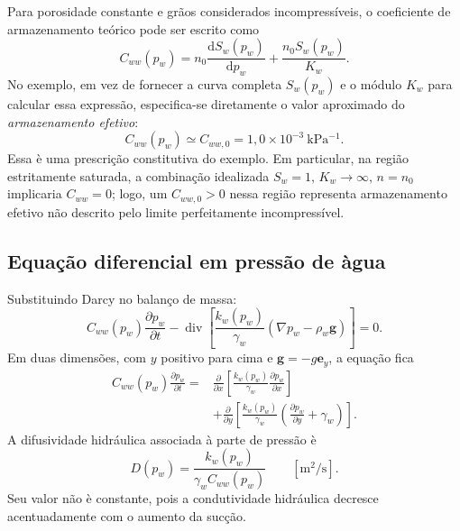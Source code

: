 \documentclass[11pt,a4paper]{article}
\newcommand{\Div}{\operatorname{div}}
\newcommand{\dd}{\mathrm{d}}
\begin{document}
Para porosidade constante e gr\~aos considerados incompress\'iveis,
o coeficiente de armazenamento te\'orico pode ser escrito como
\begin{equation*}
\boxed{C_{ww}(p_w)=
n_0\frac{\dd S_w(p_w)}{\dd p_w}
+\frac{n_0S_w(p_w)}{K_w}.}
\end{equation*}
No exemplo, em vez de fornecer a curva completa $S_w(p_w)$ e o m\'odulo
$K_w$ para calcular essa express\~ao, especifica-se diretamente
o valor aproximado do \emph{armazenamento efetivo}:
\begin{equation*}
\boxed{C_{ww}(p_w)\simeq C_{ww,0}
=1{,}0\times10^{-3}\ \mathrm{kPa^{-1}}.}
\end{equation*}
Essa \`e uma prescri\c{c}\~ao constitutiva do exemplo. Em particular,
na regi\~ao estritamente saturada, a combina\c{c}\~ao idealizada
$S_w=1$, $K_w\to\infty$, $n=n_0$ implicaria $C_{ww}=0$;
logo, um $C_{ww,0}>0$ nessa regi\~ao representa armazenamento
efetivo n\~ao descrito pelo limite perfeitamente incompress\'ivel.

\subsection{Equa\c{c}\~ao diferencial em press\~ao de \`agua}

Substituindo Darcy no balan\c{c}o de massa:
\begin{equation*}
\boxed{C_{ww}(p_w)\frac{\partial p_w}{\partial t}
-\Div\left[\frac{k_w(p_w)}{\gamma_w}
\left(\nabla p_w-\rho_w\mathbf g\right)\right]=0.}
\end{equation*}
Em duas dimens\~oes, com $y$ positivo para cima e
$\mathbf g=-g\mathbf e_y$, a equa\c{c}\~ao fica
\begin{equation*}
\boxed{\begin{aligned}
C_{ww}(p_w)\frac{\partial p_w}{\partial t}
={}&\frac{\partial}{\partial x}\left[
\frac{k_w(p_w)}{\gamma_w}\frac{\partial p_w}{\partial x}\right]\\
&+\frac{\partial}{\partial y}\left[
\frac{k_w(p_w)}{\gamma_w}
\left(\frac{\partial p_w}{\partial y}+\gamma_w\right)\right].
\end{aligned}}
\end{equation*}
A difusividade hidr\'aulica associada \`a parte de press\~ao \`e
\begin{equation*}
\boxed{D(p_w)=\frac{k_w(p_w)}{\gamma_w C_{ww}(p_w)}
\qquad[\mathrm{m^2/s}].}
\end{equation*}
Seu valor n\~ao \`e constante, pois a condutividade hidr\'aulica
decresce acentuadamente com o aumento da suc\c{c}\~ao.
\end{document}

